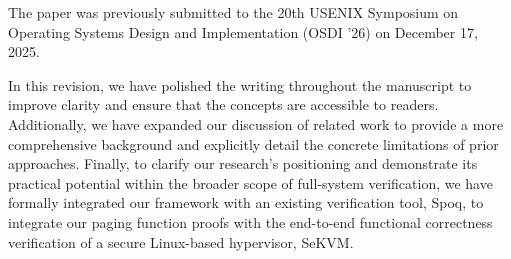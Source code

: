 \documentclass{article}
\begin{document}
The paper was previously submitted to the 20th USENIX Symposium on Operating Systems Design and Implementation (OSDI '26) on December 17, 2025.

In this revision, we have polished the writing throughout the manuscript to improve clarity and ensure that the concepts are accessible to readers. Additionally, we have expanded our discussion of related work to provide a more comprehensive background and explicitly detail the concrete limitations of prior approaches. Finally, to clarify our research's positioning and demonstrate its practical potential within the broader scope of full-system verification, we have formally integrated our framework with an existing verification tool, Spoq, to integrate our paging function proofs with the end-to-end functional correctness verification of a secure Linux-based hypervisor, SeKVM.
\end{document}
